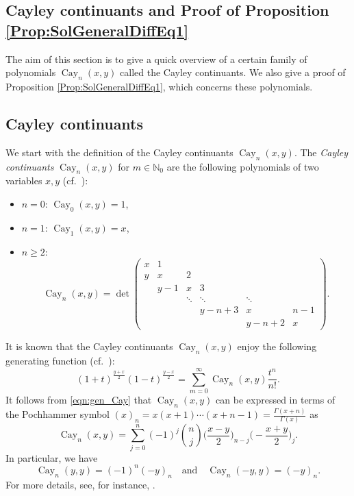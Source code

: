 \documentclass[a4paper,11pt,reqno]{amsart}
\newcommand{\NN}{\mathbb{N}}
\newcommand{\0}{{\bf 0}}
\newcommand{\1}{{\bf 1}}
\DeclareMathOperator{\Cay}{Cay}
\theoremstyle{plain}
\theoremstyle{definition}
\numberwithin{equation}{section}
\theoremstyle{definition}
\begin{document}
\begin{appendices}
\section{Cayley continuants and Proof of Proposition \texorpdfstring{\ref{Prop:SolGeneralDiffEq1}}{8.12}}
\label{appendix:Cayely}

The aim of this section is to give a quick overview of a certain family of polynomials 
$\Cay_n(x,y)$ called the Cayley continuants. We also give a proof of 
Proposition \ref{Prop:SolGeneralDiffEq1}, which concerns these polynomials.

\subsection{Cayley continuants}
\label{appendix:CayleyCont}

We start with the definition of the Cayley continuants $\Cay_n(x,y)$. 
The \emph{Cayley continuants} $\Cay_n(x,y)$ for $m\in \NN_0$ are
the following polynomials of two variables $x,y$
(cf.\ \cite{Cayley58,MT05}):
\begin{itemize}
\item $n=0$: $\Cay_0(x,y)=1$, \vspace{3pt}
\item $n=1$: $\Cay_1(x,y)=x$, \vspace{3pt}
\item $n\geq 2$: 
\begin{equation}\label{eqn:Cayley}
\Cay_n(x,y)=\det \begin{pmatrix}
    x & 1 &     &    & \\
    y &  x & 2 &    &\\
        & y-1 & x & 3 & \\
    & & \ddots & \ddots & \ddots &\\
    & & & y-n+3 & x & n-1\\
    & & & &y-n+2 & x
\end{pmatrix}.
\end{equation}
\end{itemize}

It is known that the Cayley continuants $\Cay_n(x,y)$ enjoy the following 
generating function (cf.\ \cite[(4)]{MT05}):
\begin{equation}\label{eqn:gen_Cay}
(1+t)^{\frac{y+x}{2}}(1-t)^{\frac{y-x}{2}} = 
\sum_{m=0}^\infty\Cay_n(x,y) \frac{t^n}{n!}.
\end{equation}
It follows from \eqref{eqn:gen_Cay} that 
$\Cay_n(x,y)$ can be expressed in terms of the Pochhammer symbol $(x)_n=x(x+1)\cdots(x+n-1)=\frac{\Gamma(x+n)}{\Gamma(x)}$ as
\begin{equation}\label{eq:CayleyContExpansion}
\Cay_n(x,y)=\sum_{j=0}^n(-1)^j\binom{n}{j}\Big(\frac{x-y}{2}\Big)_{n-j}\Big(-\frac{x+y}{2}\Big)_{j}.
\end{equation}
In particular, we have
\begin{equation*}
\Cay_n(y,y)= (-1)^n(-y)_n
\quad
\text{and}
\quad
\Cay_n(-y,y)=(-y)_n.
\end{equation*}
For more details, see, for instance, \cite{MT05}.



\end{appendices}
\end{document}
